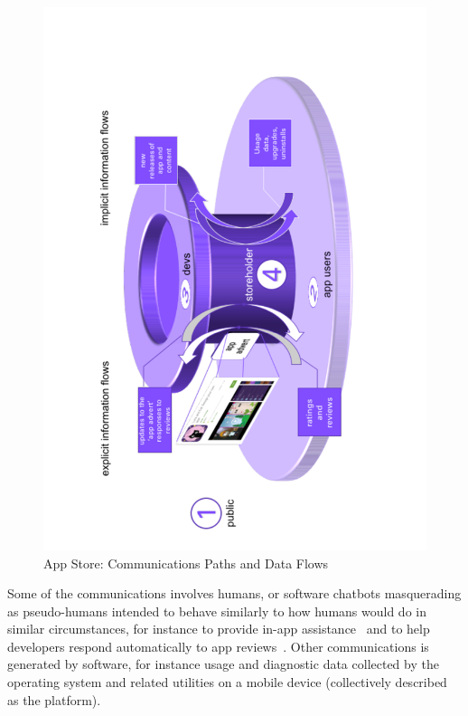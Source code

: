 \begin{figure}
    \includegraphics[width=\linewidth]{images/my/app-store-data-flows-3d.pdf}
    \caption{App Store: Communications Paths and Data Flows}
    \label{fig:app-store-data-flows}
\end{figure}

Some of the communications involves humans, or software chatbots masquerading as pseudo-humans intended to behave similarly to how humans would do in similar circumstances, for instance to provide in-app assistance~ and to help developers respond automatically to app reviews~. Other communications is generated by software, for instance usage and diagnostic data collected by the operating system and related utilities on a mobile device (collectively described as the platform).

